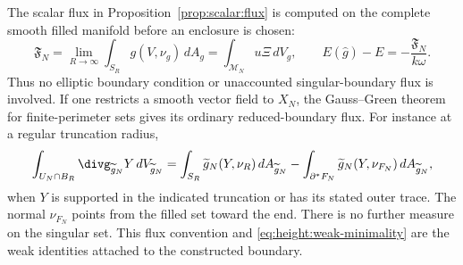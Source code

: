 \begin{remark}\label{rem:height:flux}
The scalar flux in Proposition~\ref{prop:scalar:flux} is computed on
the complete smooth filled manifold before an enclosure is chosen:
\[
 \mathfrak F_N=\lim_{R\to\infty}\int_{S_R}g(V,\nu_g)\,dA_g
 =\int_{\mathcal M_N}u\Xi\,dV_g,
 \qquad E(\widehat g)-E=-\frac{\mathfrak F_N}{k\omega}.
\]
Thus no elliptic boundary condition or unaccounted singular-boundary
flux is involved.  If one restricts a smooth vector field to $X_N$,
the Gauss--Green theorem for finite-perimeter sets gives its ordinary
reduced-boundary flux.  For instance at a regular truncation radius,
\[
 \int_{U_N\cap B_R}\divg_{\widetilde g_N}Y\,dV_{\widetilde g_N}
 =\int_{S_R}\widetilde g_N(Y,\nu_R)\,dA_{\widetilde g_N}
 -\int_{\partial^*F_N}\widetilde g_N(Y,\nu_{F_N})\,
 dA_{\widetilde g_N},
\]
when $Y$ is supported in the indicated truncation or has its stated
outer trace.  The normal $\nu_{F_N}$ points from the filled set toward
the end.  There is no further measure on the singular set.  This flux
convention and \eqref{eq:height:weak-minimality} are the weak
identities attached to the constructed boundary.
\end{remark}
